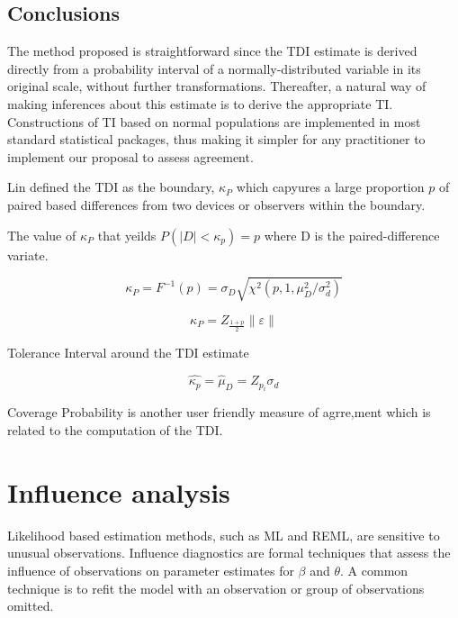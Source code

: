 \documentclass[]{article}
\begin{document}
\subsection{Conclusions}
The method proposed is straightforward since the TDI estimate is derived directly from a probability interval of a normally-distributed variable in its original scale, without further transformations. Thereafter, a natural way of making inferences about this estimate is to derive the appropriate TI. Constructions of TI based on normal populations are implemented in most standard statistical packages, thus making it simpler for any practitioner to implement our proposal to assess agreement.

Lin defined the TDI as the boundary, $\kappa_P$ which capyures a large proportion $p$ of paired based differences from 
two devices or observers within the boundary.

The value of $\kappa_P$ that yeilds $P(|D| <\kappa_p) = p$ where D is the paired-difference variate.


\[ \kappa_P = F^{-1}(p) = \sigma_D \sqrt{\chi^2(p,1,\mu^2_D/\sigma^2_d) }  \]

\[ \kappa_P = Z_{\frac{1+p}{2}} \| \varepsilon\| \]



Tolerance Interval around the TDI estimate

\[ \hat{\kappa_p} = \hat{\mu}_D = Z_{p_i}\sigma_d \]


Coverage Probability is another user friendly measure of agrre,ment which is related to the computation of the TDI.


	\newpage
	\section{Influence analysis} %
	
	Likelihood based estimation methods, such as ML and REML, are sensitive to unusual observations. Influence diagnostics are formal techniques that assess the influence of observations on parameter estimates for $\beta$ and $\theta$. A common technique is to refit the model with an observation or group of observations omitted.
	
\end{document}
